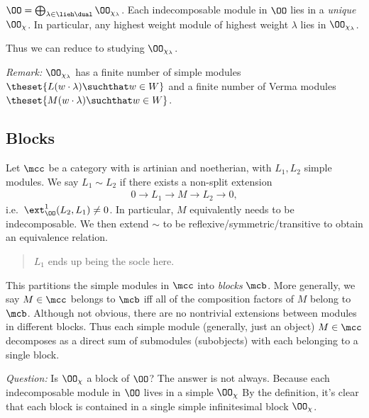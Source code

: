 \begin{description}
\tightlist
\item[Proposition (O Factors into Blocks, Indecomposables/Highest Weight
Modules Lie in a Single Block)]
\(\OO = \bigoplus_{\lambda \in \lieh\dual} \OO_{\chi_\lambda}\). Each
indecomposable module in \(\OO\) lies in a \emph{unique} \(\OO_\chi\).
In particular, any highest weight module of highest weight \(\lambda\)
lies in \(\OO_{\chi_\lambda}\).
\end{description}

Thus we can reduce to studying \(\OO_{\chi_\lambda}\).

\emph{Remark:} \(\OO_{\chi_\lambda}\) has a finite number of simple
modules \(\theset{L(w\cdot \lambda) \suchthat w\in W}\) and a finite
number of Verma modules \(\theset{M(w\cdot \lambda) \suchthat w\in W}\).

\hypertarget{blocks}{%
\subsection{Blocks}\label{blocks}}

Let \(\mcc\) be a category with is artinian and noetherian, with
\(L_1, L_2\) simple modules. We say \(L_1 \sim L_2\) if there exists a
non-split extension
\begin{align*}0 \to L_1 \to M \to L_2 \to 0,\end{align*}
i.e.~\(\ext^1_\OO(L_2, L_1) \neq 0\). In particular, \(M\) equivalently
needs to be indecomposable. We then extend \(\sim\) to be
reflexive/symmetric/transitive to obtain an equivalence relation.

\begin{quote}
\(L_1\) ends up being the socle here.
\end{quote}

This partitions the simple modules in \(\mcc\) into \emph{blocks}
\(\mcb\). More generally, we say \(M\in \mcc\) belongs to \(\mcb\) iff
all of the composition factors of \(M\) belong to \(\mcb\). Although not
obvious, there are no nontrivial extensions between modules in different
blocks. Thus each simple module (generally, just an object)
\(M\in \mcc\) decomposes as a direct sum of submodules (subobjects) with
each belonging to a single block.

\emph{Question:} Is \(\OO_\chi\) a block of \(\OO\)? The answer is not
always. Because each indecomposable module in \(\OO\) lives in a simple
\(\OO_\chi\) By the definition, it's clear that each block is contained
in a single simple infinitesimal block \(\OO_\chi\).

